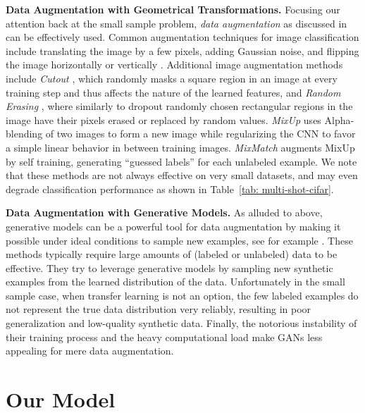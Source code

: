\documentclass[a4paper,conference]{IEEEtran}
\begin{document}
\textbf{Data Augmentation with Geometrical Transformations.} Focusing our attention back at the small sample problem, \emph{data augmentation} as discussed in \cite{Tanner1987TheCO} can be effectively used. Common augmentation techniques for image classification include translating the image by a few pixels, adding Gaussian noise, and flipping the image horizontally or vertically \cite{Baird1993DocumentID, Krizhevsky2012ImageNetCW, Cubuk2018AutoAugmentLA}. Additional image augmentation methods include \emph{Cutout} \cite{devries2017improved}, which randomly masks a square region in an image at every training step and thus affects the nature of the learned features, and \emph{Random Erasing} \cite{randomerasing}, where similarly to dropout randomly chosen rectangular regions in the image have their pixels erased or replaced by random values. \emph{MixUp} \cite{zhang2017mixup} uses Alpha-blending of two images to form a new image while regularizing the CNN to favor a simple linear behavior in between training images. \emph{MixMatch} \cite{berthelot2019mixmatch} augments MixUp by self training, generating “guessed labels” for each unlabeled example. We note that these methods are not always effective on very small datasets, and may even degrade classification performance as shown in Table~\ref{tab: multi-shot-cifar}.

\textbf{Data Augmentation with Generative Models.}
As alluded to above, generative models can be a powerful tool for data augmentation by making it possible under ideal conditions to sample new examples, see for example \cite{schwartz2018delta,antoniou2018augmenting,zhang2019dada,devries2017dataset,liu2018data,zhang2017mixup}.
These methods typically require large amounts of (labeled or unlabeled) data to be effective. 
They try to leverage generative models by sampling new synthetic examples from the learned distribution of the data. 
Unfortunately in the small sample case, when transfer learning is not an option, the few labeled examples do not represent the true data distribution very reliably, resulting in poor generalization and low-quality synthetic data. Finally, the notorious instability of their training process and the heavy computational load make GANs less appealing for mere data augmentation.




\section{Our Model}
\label{sec:model}
\end{document}
